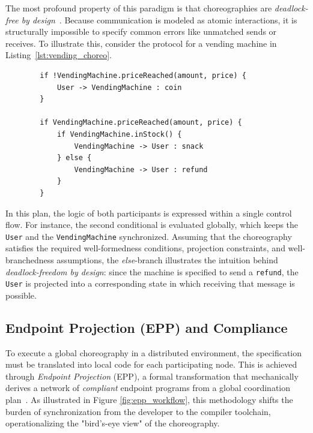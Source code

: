The most profound property of this paradigm is that choreographies are \textit{deadlock-free by design}~\cite{CarboneM13, Montesi2013}. Because communication is modeled as atomic interactions, it is structurally impossible to specify common errors like unmatched sends or receives. To illustrate this, consider the protocol for a vending machine in Listing~\ref{lst:vending_choreo}.

\begin{listing}[ht]
	\begin{verbatim}
		if !VendingMachine.priceReached(amount, price) {
			User -> VendingMachine : coin
		}
		
		if VendingMachine.priceReached(amount, price) {
			if VendingMachine.inStock() {
				VendingMachine -> User : snack
			} else {
				VendingMachine -> User : refund
			}
		}	
	\end{verbatim}
	\caption{A minimal choreography specifying the interaction between a user and a vending machine.}
	\label{lst:vending_choreo}	
\end{listing}

In this plan, the logic of both participants is expressed within a single control flow. For instance, the second conditional is evaluated globally, which keeps the \texttt{User} and the \texttt{VendingMachine} synchronized. Assuming that the choreography satisfies the required well-formedness conditions, projection constraints, and well-branchedness assumptions, the \textit{else}-branch illustrates the intuition behind \textit{deadlock-freedom by design}: since the machine is specified to send a \texttt{refund}, the \texttt{User} is projected into a corresponding state in which receiving that message is possible.

\subsection{Endpoint Projection (EPP) and Compliance}
\label{sec:epp}

To execute a global choreography in a distributed environment, the specification must be translated into local code for each participating node. This is achieved through \textit{Endpoint Projection} (EPP), a formal transformation that mechanically derives a network of \textit{compliant} endpoint programs from a global coordination plan~\cite{Montesi2013}. As illustrated in Figure \ref{fig:epp_workflow}, this methodology shifts the burden of synchronization from the developer to the compiler toolchain, operationalizing the "bird's-eye view" of the choreography.

